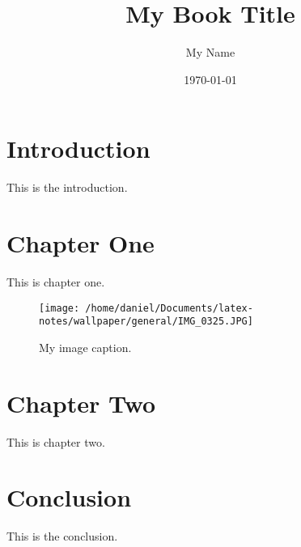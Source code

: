 \documentclass{book}
\begin{document}
\frontmatter
\title{My Book Title}
\author{My Name}
\date{\today}
\maketitle

\tableofcontents

\chapter{Introduction}
This is the introduction.
\lipsum

\mainmatter

\lipsum
\chapter{Chapter One}
This is chapter one.

\lipsum
\begin{figure}[ht]
\centering
\texttt{[image: /home/daniel/Documents/latex-notes/wallpaper/general/IMG\_0325.JPG]}
\caption{My image caption.}
\label{fig:myimage}
\end{figure}

\lipsum
\chapter{Chapter Two}
This is chapter two.

\lipsum
\backmatter

\lipsum
\chapter{Conclusion}
This is the conclusion.

\lipsum
\end{document}
